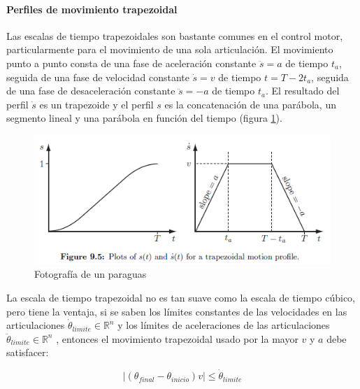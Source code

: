         \newpage

             
        \paragraph{Perfiles de movimiento trapezoidal}\label{Perfiles_de_movimiento_trapezoidal}
        
        Las escalas de tiempo trapezoidales son bastante comunes en el control motor, particularmente para el movimiento de una sola articulación. El movimiento punto a punto consta de una fase de aceleración constante $\ddot{s}=a$ de tiempo $t_a$, seguida de una fase de velocidad constante $\dot{s}=v$ de tiempo $t = T-2t_a$, seguida de una fase de desaceleración constante $\ddot{s}=-a$ de tiempo $t_a$. El resultado del perfil $\dot{s}$ es un trapezoide y el perfil $s$ es la concatenación de una parábola, un segmento lineal y una parábola en función del tiempo (figura \ref{f:Cap4_tray_9}).

            \begin{figure}[htb]
                \centering
                \includegraphics[width=0.7\linewidth]{Main/Chapter4/Images4/cap4_tray_9.png}
                \caption{Fotografía de un paraguas}
                \label{f:Cap4_tray_9}
            \end{figure}  
    
        La escala de tiempo trapezoidal no es tan suave como la escala de tiempo cúbico, pero tiene la ventaja, si se saben los límites constantes de las velocidades en las articulaciones  ${\dot{\theta}}_{limite} \in {\mathbb{R}}^n $   y los límites de aceleraciones de las articulaciones ${\ddot{\theta}}_{limite} \in {\mathbb{R}}^n $  , entonces el movimiento trapezoidal usado por la mayor $v$ y $a$  debe satisfacer:
        
        \begin{equation}
             \left| ({\theta}_{final}-{\theta}_{inicio})v \right|   \leq {\dot{\theta}}_{limite}
            \label{eq:cap4_tray_28}
        \end{equation}
        
